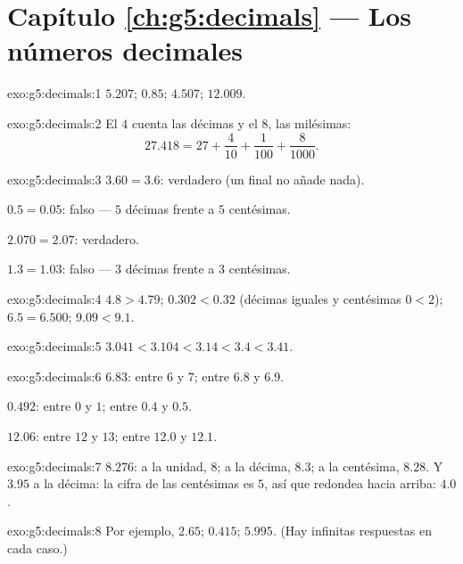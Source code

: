 \section*{Capítulo \ref{ch:g5:decimals} --- Los números decimales}

\begin{solution}{exo:g5:decimals:1}
$5.207$; \quad $0.85$; \quad $4.507$; \quad $12.009$.
\end{solution}

\begin{solution}{exo:g5:decimals:2}
El $4$ cuenta las décimas y el $8$, las milésimas:
\[
27.418 = 27 + \frac{4}{10} + \frac{1}{100} + \frac{8}{1000}.
\]
\end{solution}

\begin{solution}{exo:g5:decimals:3}
$3.60 = 3.6$: verdadero (un  final no añade nada).

$0.5 = 0.05$: falso --- $5$ décimas frente a $5$ centésimas.

$2.070 = 2.07$: verdadero.

$1.3 = 1.03$: falso --- $3$ décimas frente a $3$ centésimas.
\end{solution}

\begin{solution}{exo:g5:decimals:4}
$4.8 > 4.79$; \quad $0.302 < 0.32$ (décimas iguales y centésimas
$0 < 2$); \quad $6.5 = 6.500$; \quad $9.09 < 9.1$.
\end{solution}

\begin{solution}{exo:g5:decimals:5}
$3.041 < 3.104 < 3.14 < 3.4 < 3.41$.
\end{solution}

\begin{solution}{exo:g5:decimals:6}
$6.83$: entre $6$ y $7$; entre $6.8$ y $6.9$.

$0.492$: entre $0$ y $1$; entre $0.4$ y $0.5$.

$12.06$: entre $12$ y $13$; entre $12.0$ y $12.1$.
\end{solution}

\begin{solution}{exo:g5:decimals:7}
$8.276$: a la unidad, $8$; a la décima, $8.3$; a la centésima,
$8.28$. Y $3.95$ a la décima: la cifra de las centésimas es $5$, así que redondea
hacia arriba: $4.0$.
\end{solution}

\begin{solution}{exo:g5:decimals:8}
Por ejemplo, $2.65$; \quad $0.415$; \quad $5.995$. (Hay infinitas
respuestas en cada caso.)
\end{solution}

